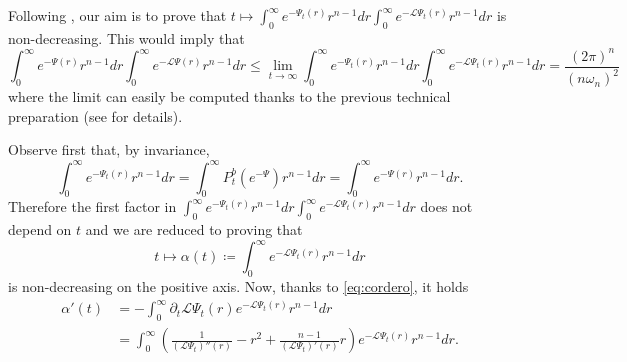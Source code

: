 \documentclass[11pt]{article}
\newcommand{\1}{[1]}
\begin{document}
Following \cite{cordero}, our aim is to prove that
$
t \mapsto 
\int_0^\infty e^{-\Psi_t(r)}r^{n-1}dr  
\int_0^\infty e^{-\mathcal{L}\Psi_t(r)}r^{n-1}dr  
$
 is non-decreasing. 
This would imply that 
$$
\int_0^\infty \!e^{-\Psi(r)}r^{n-1}dr  
\int_0^\infty \!e^{-\mathcal{L}\Psi(r)}r^{n-1}dr
\leq 
\lim_{t \to \infty}
\int_0^\infty \!e^{-\Psi_t(r)}r^{n-1}dr  
\int_0^\infty \!e^{-\mathcal{L}\Psi_t(r)}r^{n-1}dr
= \frac{(2\pi)^n}{(n \omega_n)^2}
$$
 where the limit can easily be computed thanks to the previous technical preparation (see \cite{artstein-klartag-milman,cordero} for  details). 
 
Observe first that, by invariance,
\begin{equation} \label{eq:0}
\int_0^\infty e^{-\Psi_t(r)}r^{n-1}dr = 
\int_0^\infty P_t^b(e^{-\Psi})r^{n-1}dr 
=
\int_0^\infty e^{-\Psi(r)} r^{n-1}dr .
\end{equation}
Therefore the first factor in $\int_0^\infty e^{-\Psi_t(r)}r^{n-1}dr  
\int_0^\infty e^{-\mathcal{L}\Psi_t(r)}r^{n-1}dr$  does not depend on $t$ and we are reduced to proving that
$$
t \mapsto \alpha(t) \coloneqq \int_0^\infty e^{-\mathcal{L}\Psi_t(r)}r^{n-1}dr 
$$
is non-decreasing on the positive axis.
Now, thanks to \eqref{eq:cordero}, it holds
\begin{align*}
\alpha'(t) 
& = 
-   
    \int_0^\infty  \partial_t \mathcal{L}\Psi_t(r) e^{-\mathcal{L}\Psi_t(r)}r^{n-1}dr  \\
&    =
    \int_0^\infty   \left( \frac{1}{(\mathcal{L}\Psi_t)''(r)} - r^2 + \frac{n-1}{(\mathcal{L}\Psi_t)'(r)}r \right) e^{-\mathcal{L}\Psi_t(r)}r^{n-1}dr .     
\end{align*}
\end{document}
